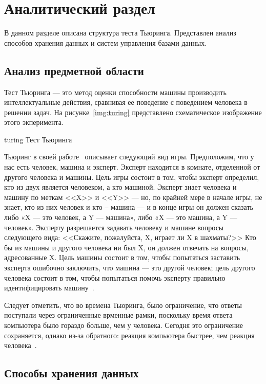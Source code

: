 \section{Аналитический раздел}

В данном разделе описана структура теста Тьюринга.  
Представлен анализ способов хранения данных и систем управления базами данных. 

\subsection{Анализ предметной области}
Тест Тьюринга --- это метод оценки способности машины производить интеллектуальные действия, сравнивая ее поведение с поведением человека в решении задач. 
На рисунке~\ref{img:turing} представлено схематическое изображение этого экперимента.

\img{100mm}
{turing}
{Тест Тьюринга}

Тьюринг в своей работе~\cite{10.1093/mind/LIX.236.433} описывает следующий вид игры.
Предположим, что у нас есть человек, машина и эксперт. 
Эксперт находится в комнате, отделенной от другого человека и машины. 
Цель игры состоит в том, чтобы эксперт определил, кто из двух является человеком, а кто машиной. 
Эксперт знает человека и машину по меткам <<X>> и <<Y>> --- но, по крайней мере в начале игры, не знает, кто из них человек и кто -- машина --- и в конце игры он должен сказать либо «X --- это человек, а Y --- машина», либо «X --- это машина, а Y --- человек».
Эксперту разрешается задавать человеку и машине вопросы следующего вида: <<Скажите, пожалуйста, X, играет ли X в шахматы?>> Кто бы из машины и другого человека ни был X, он должен отвечать на вопросы, адресованные X.
Цель машины состоит в том, чтобы попытаться заставить эксперта ошибочно заключить, что машина --- это другой человек; цель другого человека состоит в том, чтобы попытаться помочь эксперту правильно идентифицировать машину~\cite{sep-turing-test}.

Следует отметить, что во времена Тьюринга, было ограничение, что ответы поступали через ограниченные врменные рамки, поскольку время ответа компьютера было гораздо больше, чем у человека. 
Сегодня это ограничение сохраняется, однако из-за обратного: реакция компьютера быстрее, чем реакция человека~\cite{10.1093/mind/LIX.236.433}.

\subsection{Способы хранения данных}

